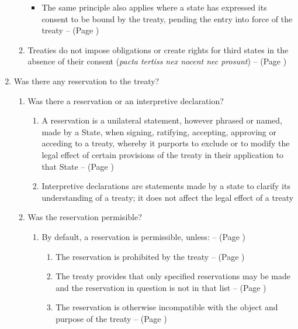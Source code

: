 \begin{enumerate}
\begin{enumerate}
        \begin{itemize}
            \item The same principle also applies where a state has expressed its consent to be bound by the treaty, pending the entry into force of the treaty --  (Page \pageref{VCLT Art 18})
        \end{itemize}
        \item Treaties do not impose obligations or create rights for third states in the absence of their consent (\textit{pacta tertiss nex nocent nec prosunt}) --  (Page \pageref{VCLT Art 34})
    \end{enumerate}
    \item Was there any reservation to the treaty?
    \begin{enumerate}
        \item Was there a reservation or an interpretive declaration?
        \begin{enumerate}
            \item A reservation is a unilateral statement, however phrased or named, made by a State, when signing, ratifying, accepting, approving or acceding to a treaty, whereby it purports to exclude or to modify the legal effect of certain provisions of the treaty in their application to that State --  (Page \pageref{VCLT Art 2})
            \item Interpretive declarations are statements made by a state to clarify its understanding of a treaty; it does not affect the legal effect of a treaty
        \end{enumerate}
        \item Was the reservation permisible?
        \begin{enumerate}
            \item By default, a reservation is permissible, unless: --  (Page \pageref{VCLT Art 19})
            \begin{enumerate}
                \item The reservation is prohibited by the treaty --  (Page \pageref{VCLT Art 19})
                \item The treaty provides that only specified reservations may be made and the reservation in question is not in that list --  (Page \pageref{VCLT Art 19})
                \item The reservation is otherwise incompatible with the object and purpose of the treaty --  (Page \pageref{VCLT Art 19})

\end{enumerate}
\end{enumerate}
\end{enumerate}
\end{enumerate}

